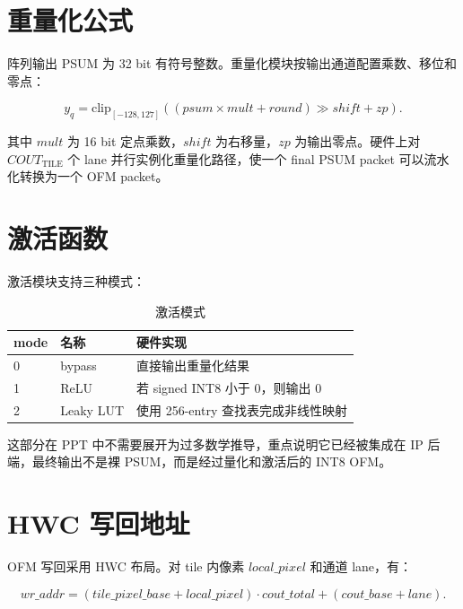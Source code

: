 \documentclass[fontset=fandol,ugly,language=chinese]{pkuthss}
\newcommand{\COUTTILE}{COUT_{\mathrm{TILE}}}
\begin{document}
\section{重量化公式}

阵列输出 PSUM 为 32 bit 有符号整数。重量化模块按输出通道配置乘数、移位和零点：

\begin{equation}
y_q =
\mathrm{clip}_{[-128,127]}
\left(
\left(
psum \times mult + round
\right) \gg shift
 + zp
\right).
\label{eq:requant_report}
\end{equation}

其中 $mult$ 为 16 bit 定点乘数，$shift$ 为右移量，$zp$ 为输出零点。硬件上对 $\COUTTILE$ 个 lane 并行实例化重量化路径，使一个 final PSUM packet 可以流水化转换为一个 OFM packet。

\section{激活函数}

激活模块支持三种模式：

\begin{table}[htbp]
\centering
\caption{激活模式}
\label{tab:activation_modes}
\begin{tabular}{lll}
\toprule
\textbf{mode} & \textbf{名称} & \textbf{硬件实现} \\
\midrule
0 & bypass & 直接输出重量化结果 \\
1 & ReLU & 若 signed INT8 小于 0，则输出 0 \\
2 & Leaky LUT & 使用 256-entry 查找表完成非线性映射 \\
\bottomrule
\end{tabular}
\end{table}

这部分在 PPT 中不需要展开为过多数学推导，重点说明它已经被集成在 IP 后端，最终输出不是裸 PSUM，而是经过量化和激活后的 INT8 OFM。

\section{HWC 写回地址}

OFM 写回采用 HWC 布局。对 tile 内像素 $local\_pixel$ 和通道 lane，有：

\begin{equation}
wr\_addr =
(tile\_pixel\_base + local\_pixel)\cdot cout\_total
+ (cout\_base + lane).
\label{eq:writeback_report}
\end{equation}
\end{document}
